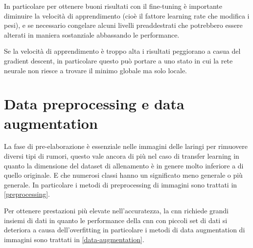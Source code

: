 In particolare per ottenere buoni risultati con il fine-tuning è importante diminuire la velocità di apprendimento (cioè il fattore learning rate che modifica i pesi), e se necessario congelare alcuni livelli preaddestrati che potrebbero essere alterati in maniera sostanziale abbassando le performance.

Se la velocità di apprendimento è troppo alta i risultati peggiorano a casua del gradient descent, in particolare questo può portare a uno stato in cui la rete neurale non riesce a trovare il minimo globale ma solo locale\cite{joel_ft_tl_lfs}\cite{joel_tl}.

\section{Data preprocessing e data augmentation}\label{data-pre-processing-e-augmentation-processing}

La fase di pre-elaborazione è essenziale nelle immagini delle laringi per rimuovere diversi tipi di rumori, questo vale ancora di più nel caso di transfer learning in quanto la dimensione del dataset di allenamento è in genere molto inferiore a di quello originale. E che numerosi classi hanno un significato meno generale o più generale\cite{joel_tl}. In particolare i metodi di preprocessing di immagini sono trattati in \cref{preprocessing}.

Per ottenere prestazioni più elevate nell'accuratezza, la \gls{cnn} richiede grandi insiemi di dati in quanto le performance della \gls{cnn} con piccoli set di dati si deteriora  a causa dell'\gls{overfitting}\cite{joel_tl} in particolare i metodi di data augmentation di immagini sono trattati in \cref{data-augmentation}.





